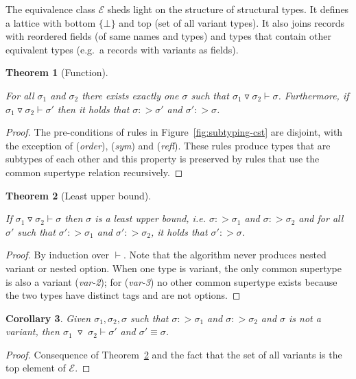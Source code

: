 \documentclass[10pt,preprint,clearpagebib]{sigplanconf}
\newcommand{\tsep}[0]{\; \triangledown \;}
\newtheorem{theorem}{Theorem}
\newtheorem{corollary}[theorem]{Corollary}
\begin{document}
\noindent
The equivalence class $\mathcal{E}$ sheds light on the structure of structural types. It defines
a lattice with bottom $\{ \bot \}$ and top (set of all variant types). It also joins records with
reordered fields (of same names and types) and types that contain other equivalent types (e.g.~a
records with variants as fields).

\begin{theorem}[Function]
\label{thm:func}
\raggedright
For all $\sigma_1$ and $\sigma_2$ there exists exactly one $\sigma$ such that 
$\sigma_1 \triangledown \sigma_2 \vdash \sigma$.
Furthermore, if $\sigma_1 \triangledown \sigma_2 \vdash \sigma'$
then it holds that $\sigma :> \sigma'$ and $\sigma' :> \sigma$.
\end{theorem}
\begin{proof}
The pre-conditions of rules in Figure~\ref{fig:subtyping-cst} are disjoint, with the exception 
of (\emph{order}), (\emph{sym}) and (\emph{refl}). These rules produce types that are subtypes
of each other and this property is preserved by rules that use the common supertype relation 
recursively.
\end{proof}

\begin{theorem}[Least upper bound]
\label{thm:lub}
\raggedright
If $\sigma_1 \triangledown \sigma_2 \vdash \sigma$ then $\sigma$ is a least upper bound, i.e. 
$\sigma :> \sigma_1$ and $\sigma :> \sigma_2$ and for all $\sigma'$ such that $\sigma' :> \sigma_1$
and $\sigma' :> \sigma_2$, it holds that $\sigma' :> \sigma$.
\end{theorem}
\begin{proof}
By induction over $\vdash$. Note that the algorithm never produces nested variant or nested
option. When one type is variant, the only common supertype is also a variant (\emph{var-2}); 
for (\emph{var-3}) no other common supertype exists because the two types have distinct 
tags and are not options.
\end{proof}

\begin{corollary}
\label{thm:no-unions}
Given $\sigma_1, \sigma_2, \sigma$ such that $\sigma :> \sigma_1$ and $\sigma :> \sigma_2$ and 
$\sigma$ is not a variant, then $\sigma_1 \tsep \sigma_2 \vdash \sigma'$ 
and $\sigma' \equiv \sigma$.
\end{corollary}
\begin{proof}
Consequence of Theorem~\ref{thm:lub} and the fact that the set of all variants is the
top element of $\mathcal{E}$.
\end{proof}
\end{document}
